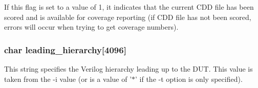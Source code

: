 If this flag is set to a value of 1, it indicates that the current CDD file has been scored and is available for coverage reporting (if CDD file has not been scored, errors will occur when trying to get coverage numbers). 
\subsubsection{\setlength{\rightskip}{0pt plus 5cm}char leading\_\-hierarchy[4096]}\label{info_8c_a1}


This string specifies the Verilog hierarchy leading up to the DUT. This value is taken from the -i value (or is a value of '$\ast$' if the -t option is only specified). 